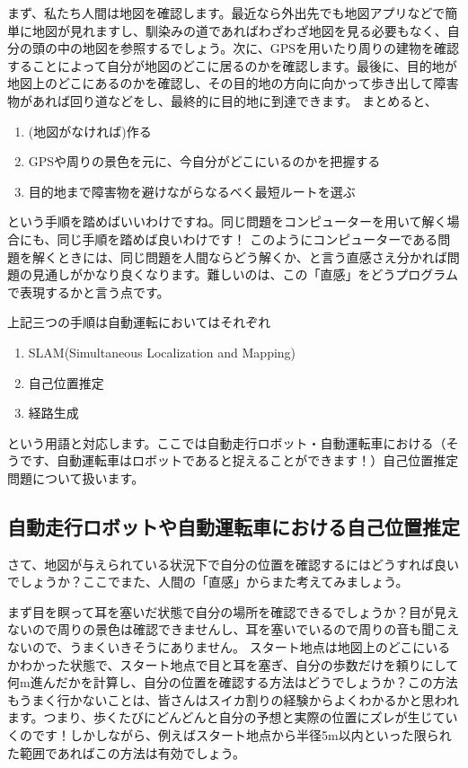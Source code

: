 \documentclass[12pt]{article}
\begin{document}
まず、私たち人間は地図を確認します。最近なら外出先でも地図アプリなどで簡単に地図が見れますし、馴染みの道であればわざわざ地図を見る必要もなく、自分の頭の中の地図を参照するでしょう。次に、GPSを用いたり周りの建物を確認することによって自分が地図のどこに居るのかを確認します。最後に、目的地が地図上のどこにあるのかを確認し、その目的地の方向に向かって歩き出して障害物があれば回り道などをし、最終的に目的地に到達できます。
まとめると、
\begin{enumerate}
	\item (地図がなければ)作る
	\item GPSや周りの景色を元に、今自分がどこにいるのかを把握する
	\item 目的地まで障害物を避けながらなるべく最短ルートを選ぶ
\end{enumerate}


という手順を踏めばいいわけですね。同じ問題をコンピューターを用いて解く場合にも、同じ手順を踏めば良いわけです！
このようにコンピューターである問題を解くときには、同じ問題を人間ならどう解くか、と言う直感さえ分かれば問題の見通しがかなり良くなります。難しいのは、この「直感」をどうプログラムで表現するかと言う点です。

上記三つの手順は自動運転においてはそれぞれ
\begin{enumerate}
	\item SLAM(Simultaneous Localization and Mapping)
	\item 自己位置推定
	\item 経路生成
\end{enumerate}
という用語と対応します。ここでは自動走行ロボット・自動運転車における（そうです、自動運転車はロボットであると捉えることができます！）自己位置推定問題について扱います。

\subsection{自動走行ロボットや自動運転車における自己位置推定}
さて、地図が与えられている状況下で自分の位置を確認するにはどうすれば良いでしょうか？ここでまた、人間の「直感」からまた考えてみましょう。

まず目を瞑って耳を塞いだ状態で自分の場所を確認できるでしょうか？目が見えないので周りの景色は確認できませんし、耳を塞いでいるので周りの音も聞こえないので、うまくいきそうにありません。
スタート地点は地図上のどこにいるかわかった状態で、スタート地点で目と耳を塞ぎ、自分の歩数だけを頼りにして何m進んだかを計算し、自分の位置を確認する方法はどうでしょうか？この方法もうまく行かないことは、皆さんはスイカ割りの経験からよくわかるかと思われます。つまり、歩くたびにどんどんと自分の予想と実際の位置にズレが生じていくのです！しかしながら、例えばスタート地点から半径5m以内といった限られた範囲であればこの方法は有効でしょう。
\end{document}
